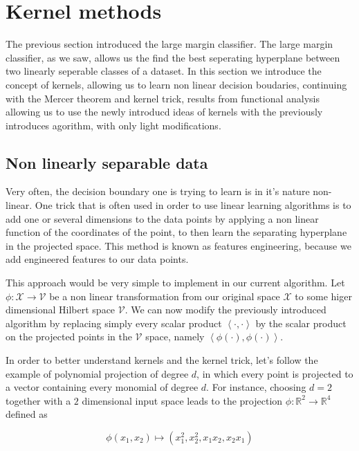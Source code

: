 \section {Kernel methods}

The previous section introduced the large margin classifier. The large margin classifier, as we saw, allows us the find the best seperating hyperplane between two linearly seperable classes of a dataset. In this section we introduce the concept of kernels, allowing us to learn non linear decision boudaries, continuing with the Mercer theorem and kernel trick, results from functional analysis allowing us to use the newly introducd ideas of kernels with the previously introduces agorithm, with only light modifications.

\subsection{Non linearly separable data}

Very often, the decision boundary one is trying to learn is in it's nature non-linear. One trick that is often used in order to use linear learning algorithms is to add one or several dimensions to the data points by applying a non linear function of the coordinates of the point, to then learn the separating hyperplane in the projected space. This method is known as features engineering, because we add engineered features to our data points.


This approach would be very simple to implement in our current algorithm. Let $\phi : \mathcal{X} \rightarrow \mathcal{V}$ be a non linear transformation from our original space $\mathcal{X}$ to some higer dimensional Hilbert space $\mathcal{V}$. We can now modify the previously introduced algorithm by replacing simply every scalar product $\left<\cdot , \cdot\right>$ by the scalar product on the projected points in the $\mathcal{V}$ space, namely $\left<\phi(\cdot), \phi(\cdot)\right>$.


In order to better understand kernels and the kernel trick, let's follow the example of polynomial projection of degree $d$, in which every point is projected to a vector containing every monomial of degree $d$. For instance, choosing $d = 2$ together with a $2$ dimensional input space leads to the projection $\phi : \mathbb{R}^2 \rightarrow \mathbb{R}^4$ defined as

\begin{equation*}
    \phi(x_1, x_2) \mapsto (x_1^2, x_2^2, x_1x_2, x_2x_1)
\end{equation*}

